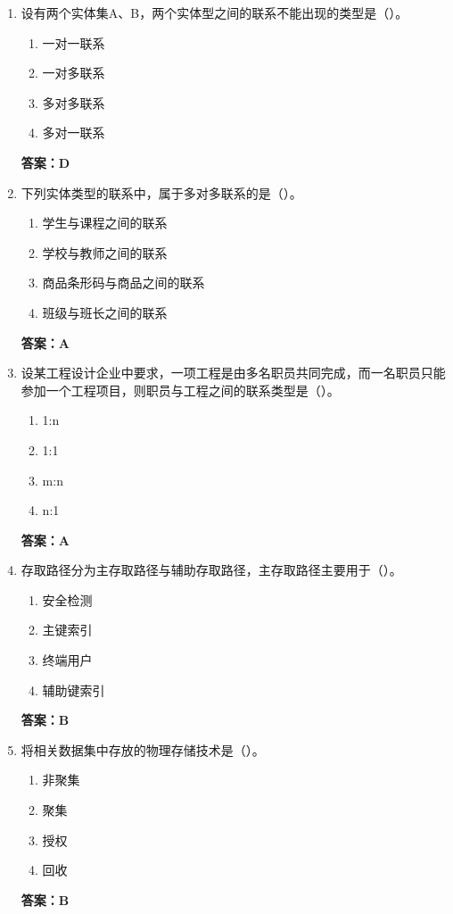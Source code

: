 \documentclass[12pt, a4paper]{article}
\begin{document}
\begin{enumerate}[label=\arabic*.]
	\item 设有两个实体集A、B，两个实体型之间的联系不能出现的类型是（\quad）。
	      \begin{enumerate}
		      \item 一对一联系
		      \item 一对多联系
		      \item 多对多联系
		      \item 多对一联系
	      \end{enumerate}
	      \textbf{答案：D}

	\item 下列实体类型的联系中，属于多对多联系的是（\quad）。
	      \begin{enumerate}
		      \item 学生与课程之间的联系
		      \item 学校与教师之间的联系
		      \item 商品条形码与商品之间的联系
		      \item 班级与班长之间的联系
	      \end{enumerate}
	      \textbf{答案：A}

	\item 设某工程设计企业中要求，一项工程是由多名职员共同完成，而一名职员只能参加一个工程项目，则职员与工程之间的联系类型是（\quad）。
	      \begin{enumerate}
		      \item 1:n
		      \item 1:1
		      \item m:n
		      \item n:1
	      \end{enumerate}
	      \textbf{答案：A}

	\item 存取路径分为主存取路径与辅助存取路径，主存取路径主要用于（\quad）。
	      \begin{enumerate}
		      \item 安全检测
		      \item 主键索引
		      \item 终端用户
		      \item 辅助键索引
	      \end{enumerate}
	      \textbf{答案：B}

	\item 将相关数据集中存放的物理存储技术是（\quad）。
	      \begin{enumerate}
		      \item 非聚集
		      \item 聚集
		      \item 授权
		      \item 回收
	      \end{enumerate}
	      \textbf{答案：B}


\end{enumerate}
\end{document}
